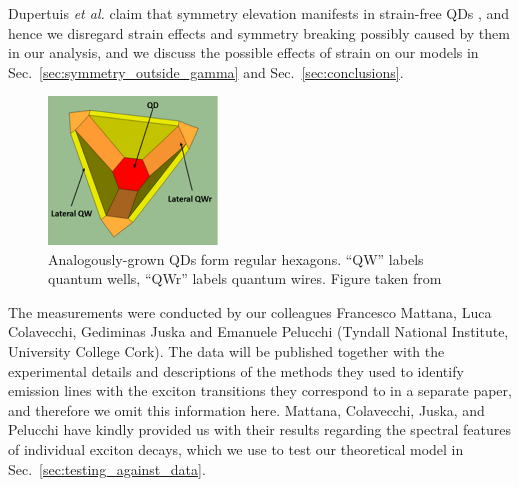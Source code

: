 \documentclass[12pt]{report}
\begin{document}
Dupertuis \textit{et al.} claim that symmetry elevation manifests in strain-free QDs \cite[p.~4]{dupertuis}, and hence we disregard strain effects and symmetry breaking possibly caused by them in our analysis, and we discuss the possible effects of strain on our models in Sec.~\ref{sec:symmetry_outside_gamma} and Sec.~\ref{sec:conclusions}.

\begin{figure}
\begin{center}
    \includegraphics[width=0.4\textwidth]{figures/hexagonal_qds}
 \caption{Analogously-grown QDs form regular hexagons. ``QW'' labels quantum wells, ``QWr'' labels quantum wires. Figure taken from \cite[Fig.~1]{hexagon}\label{fig:hexagonal_qds}}
\end{center}
\end{figure}

The measurements were conducted by our colleagues Francesco Mattana, Luca Colavecchi, Gediminas Juska and Emanuele Pelucchi (Tyndall National Institute, University College Cork). The data will be published together with the experimental details and descriptions of the methods they used to identify emission lines with the exciton transitions they correspond to in a separate paper, and therefore we omit this information here. Mattana, Colavecchi, Juska, and Pelucchi have kindly provided us with their results regarding the spectral features of individual exciton decays, which we use to test our theoretical model in Sec.~\ref{sec:testing_against_data}. 

\pagebreak








\end{document}
